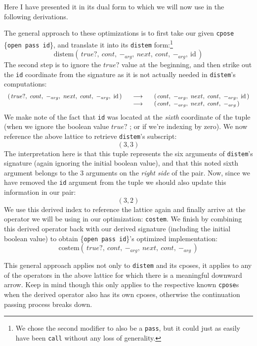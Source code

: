 \documentclass[twoside]{article}
\newcommand{\lra}{\longrightarrow}
\newcommand{\col}[1][0ex]{& \hspace{#1}}
\newcommand{\id}{\mbox{id}}
\newcommand{\costem}{\mbox{costem}}
\newcommand{\distem}{\mbox{distem}}
\newcommand{\tpose}[2]{\raisebox{#1}{\ensuremath{\star}}\{\texttt{#2}\}}
\newcommand{\deftpose}[1]{\tpose{0.1ex}{#1}}
\begin{document}
Here I have presented it in its dual form to which we will now use in the following derivations.

The general approach to these optimizations is to first take our given \texttt{cpose} \deftpose{open pass id},
and translate it into its \texttt{distem} form:\footnote{We chose the second modifier to also be a \texttt{pass},
but it could just as easily have been \texttt{call} without any loss of generality.}
$$ \distem(\,true?,\ cont,\ -_{arg},\ next,\ cont,\ -_{arg},\ \id\,) $$
The second step is to ignore the $ true? $ value at the beginning, and then strike out the \texttt{id}
coordinate from the signature as it is not actually needed in \texttt{distem}'s computations:
$$ \def\arraystretch{1}
\begin{array}{lrl}
(\,true?,\ cont,\ -_{arg},\ next,\ cont,\ -_{arg},\ \id\,)
\col[2ex] \lra \col[2ex] (\,cont,\ -_{arg},\ next,\ cont,\ -_{arg},\ \id\,)		\\
\col[2ex] \lra \col[2ex] (\,cont,\ -_{arg},\ next,\ cont,\ -_{arg}\,)
\end{array} $$
We make note of the fact that \texttt{id} was located at the \emph{sixth} coordinate of the tuple (when we ignore the boolean
value $ true? $ ; or if we're indexing by zero). We now reference the above lattice to retrieve \texttt{distem}'s subscript:
$$ (3,3) $$
The interpretation here is that this tuple represents the six arguments of \texttt{distem}'s signature (again ignoring the
initial boolean value), and that this noted sixth argument belongs to the $ 3 $ arguments on the \emph{right side} of the
pair. Now, since we have removed the \texttt{id} argument from the tuple we should also update this information in our pair:
$$ (3,2) $$
We use this derived index to reference the lattice again and finally arrive at the operator we will be using
in our optimization: \texttt{costem}. We finish by combining this derived operator back with our derived
signature (including the initial boolean value) to obtain \deftpose{open pass id}'s optimized implementation:
$$ \costem(\,true?,\ cont,\ -_{arg},\ next,\ cont,\ -_{arg}\,) $$

This general approach applies not only to \texttt{distem} and its cposes, it applies to any of the operators in the above
lattice for which there is a meaningful downward arrow. Keep in mind though this only applies to the respective known
\texttt{cpose}s when the derived operator also has its own cposes, otherwise the continuation passing process breaks down.
\end{document}
